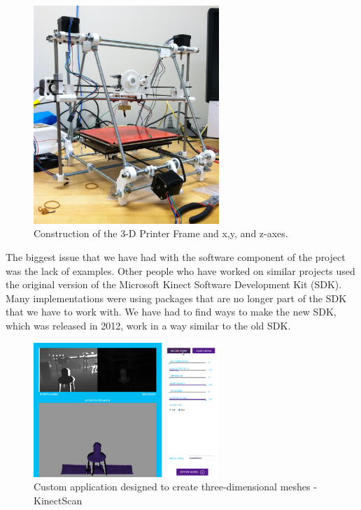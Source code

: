 \documentclass[pdftex,10.5pt]{report}
\begin{document}
\begin{figure}[H]
	\centering
	\includegraphics[width=70mm]{figures/photo.JPG}
	\caption{Construction of the 3-D Printer Frame and x,y, and z-axes.}
	\label{basebuilt}
\end{figure}

The biggest issue that we have had with the software component of the project was the lack of examples. Other people who have worked on similar projects used the original version of the Microsoft Kinect Software Development Kit (SDK). Many implementations were using packages that are no longer part of the SDK that we have to work with. We have had to find ways to make the new SDK, which was released in 2012, work in a way similar to the old SDK. 

\begin{figure}[H]
	\centering
	\includegraphics[width=70mm]{figures/KinectScan.jpg}
	\caption{Custom application designed to create three-dimensional meshes - KinectScan}
	\label{kinectscan}
\end{figure}
\end{document}
